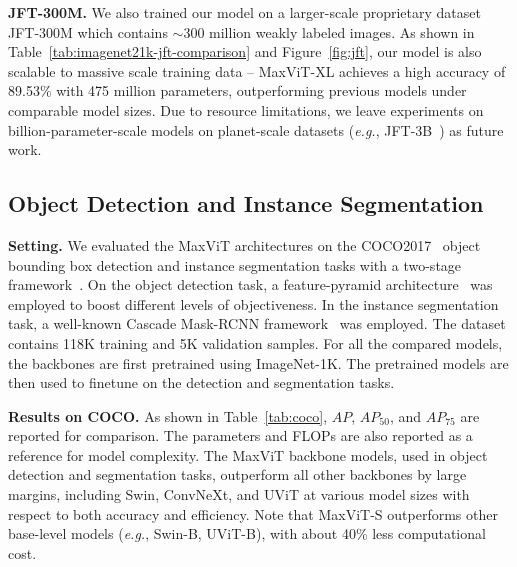 \documentclass[runningheads]{llncs}
\def\eg{\emph{e.g.}, }
\begin{document}
\hspace{-5.5mm}\textbf{JFT-300M.} We also trained our model on a larger-scale proprietary dataset JFT-300M which contains $\sim$300 million weakly labeled images. As shown in Table~\ref{tab:imagenet21k-jft-comparison} and Figure~\ref{fig:jft}, our model is also scalable to massive scale training data -- MaxViT-XL achieves a high accuracy of 89.53\% with 475 million parameters, outperforming previous models under comparable model sizes. Due to resource limitations, we leave experiments on billion-parameter-scale models on planet-scale datasets (\eg JFT-3B~\cite{zhai2021scaling}) as future work.



\subsection{Object Detection and Instance Segmentation}

\textbf{Setting.} 
We evaluated the MaxViT architectures on the COCO2017~\cite{lin2014microsoft} object bounding box detection and instance segmentation tasks with a two-stage framework~\cite{ren2015fasterrcnn}.
On the object detection task, a feature-pyramid architecture~\cite{Lin2017FeaturePN} was employed to boost different levels of objectiveness.
In the instance segmentation task, a well-known Cascade Mask-RCNN framework~\cite{he2017maskrcnn} was employed.
The dataset contains 118K training and 5K validation samples.
For all the compared models, the backbones are first pretrained using ImageNet-1K.
The pretrained models are then used to finetune on the detection and segmentation tasks.


\noindent\textbf{Results on COCO.} 
As shown in Table~\ref{tab:coco}, $AP$, $AP_{50}$, and $AP_{75}$ are reported for comparison.
The parameters and FLOPs are also reported as a reference for model complexity. 
The MaxViT backbone models, used in object detection and segmentation tasks, outperform all other backbones by large margins, including Swin, ConvNeXt, and UViT at various model sizes with respect to both accuracy and efficiency.
Note that MaxViT-S outperforms other base-level models (\eg Swin-B, UViT-B), with about 40\% less computational cost.
\end{document}
